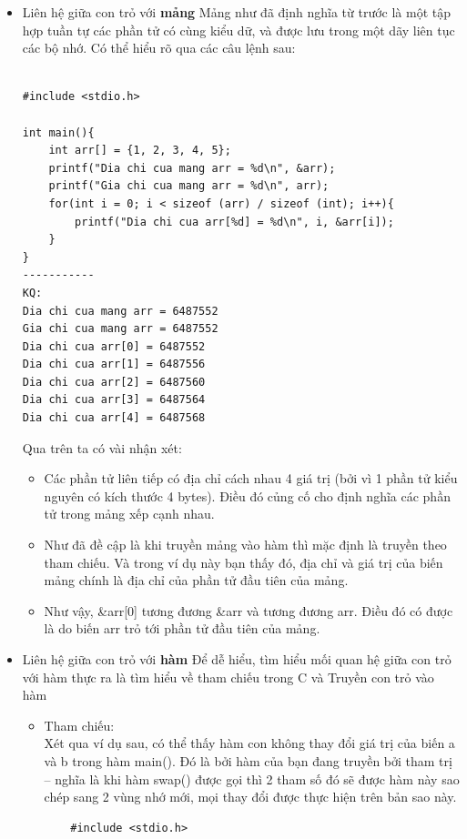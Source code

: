 \documentclass[12pt,a4paper]{article}
\begin{document}
\begin{itemize}
\item Liên hệ giữa con trỏ với \textbf{mảng}
Mảng như đã định nghĩa từ trước là một tập hợp tuần tự các phần tử có cùng kiểu dữ, và được lưu trong một dãy liên tục các bộ nhớ. Có thể hiểu rõ qua các câu lệnh sau:\\
\begin{lstlisting}

#include <stdio.h>
 
int main(){
    int arr[] = {1, 2, 3, 4, 5}; 
    printf("Dia chi cua mang arr = %d\n", &arr);
    printf("Gia chi cua mang arr = %d\n", arr);
    for(int i = 0; i < sizeof (arr) / sizeof (int); i++){
        printf("Dia chi cua arr[%d] = %d\n", i, &arr[i]);
    }
}
-----------
KQ:
Dia chi cua mang arr = 6487552
Gia chi cua mang arr = 6487552
Dia chi cua arr[0] = 6487552
Dia chi cua arr[1] = 6487556
Dia chi cua arr[2] = 6487560
Dia chi cua arr[3] = 6487564
Dia chi cua arr[4] = 6487568
\end{lstlisting}
Qua trên ta có vài nhận xét: 
\begin{itemize}
\item Các phần tử liên tiếp có địa chỉ cách nhau 4 giá trị (bởi vì 1 phần tử kiểu nguyên có kích thước 4 bytes). Điều đó củng cố cho định nghĩa các phần tử trong mảng xếp cạnh nhau.
\item Như đã đề cập là khi truyền mảng vào hàm thì mặc định là truyền theo tham chiếu. Và trong ví dụ này bạn thấy đó, địa chỉ và giá trị của biến mảng chính là địa chỉ của phần tử đầu tiên của mảng.
\item Như vậy, \&arr[0] tương đương \&arr và tương đương arr. Điều đó có được là do biến arr trỏ tới phần tử đầu tiên của mảng.
\end{itemize}

\item Liên hệ giữa con trỏ với \textbf{hàm}
Để dễ hiểu, tìm hiểu mối quan hệ giữa con trỏ với hàm thực ra là tìm hiểu về tham chiếu trong C và Truyền con trỏ vào hàm 
\begin{itemize}
\item {\large Tham chiếu}: \\
Xét qua ví dụ sau, có thể thấy hàm con không thay đổi giá trị của biến a và b trong hàm main(). Đó là bởi hàm của bạn đang truyền bởi tham trị – nghĩa là khi hàm swap() được gọi thì 2 tham số đó sẽ được hàm này sao chép sang 2 vùng nhớ mới, mọi thay đổi được thực hiện trên bản sao này.

\begin{lstlisting}
	#include <stdio.h>
 

\end{lstlisting}
\end{itemize}
\end{itemize}
\end{document}
